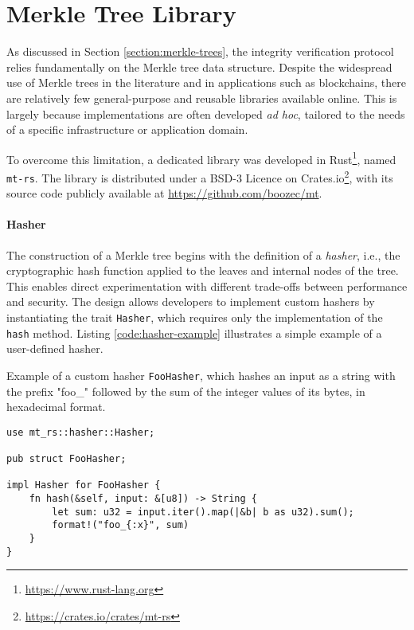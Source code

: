 \section{Merkle Tree Library} \label{sec:merkle-tree-library}

As discussed in Section \ref{section:merkle-trees}, the integrity verification
protocol relies fundamentally on the Merkle tree data structure. Despite the widespread use of Merkle trees in the literature and in applications such as blockchains, there are relatively few general-purpose and reusable libraries available online. This is largely because implementations are often developed \textit{ad hoc}, tailored to the needs of a specific infrastructure or application domain.

To overcome this limitation, a dedicated library was developed in Rust\footnote{\url{https://www.rust-lang.org}}, named \texttt{mt-rs}. The library is distributed under a BSD-3 Licence on Crates.io\footnote{\url{https://crates.io/crates/mt-rs}}, with its source code publicly available at \url{https://github.com/boozec/mt}.

\paragraph{Hasher}

The construction of a Merkle tree begins with the definition of a \textit{hasher}, i.e., the cryptographic hash function applied to the leaves and internal nodes of the tree. This enables direct experimentation with different trade-offs between performance and security. The design allows developers to implement custom hashers by instantiating the trait \texttt{Hasher}, which requires only the implementation of the \texttt{hash} method. Listing \ref{code:hasher-example} illustrates a simple example of a user-defined hasher.


\begin{listing}[!ht]
\caption{Example of a custom hasher \texttt{FooHasher}, which hashes an input as a string with the prefix "foo\_" followed by the sum of the integer values of its bytes, in hexadecimal format.}
\label{code:hasher-example}
\begin{verbatim}
use mt_rs::hasher::Hasher;

pub struct FooHasher;

impl Hasher for FooHasher {
    fn hash(&self, input: &[u8]) -> String {
        let sum: u32 = input.iter().map(|&b| b as u32).sum();
        format!("foo_{:x}", sum)
    }
}
\end{verbatim}
\end{listing}


